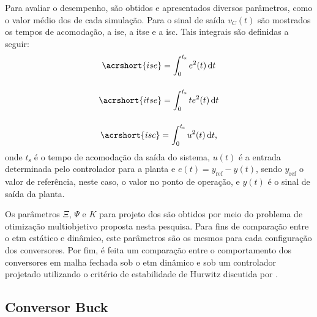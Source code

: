 Para avaliar o desempenho, são obtidos e apresentados diversos parâmetros, como o valor médio dos  de cada simulação. Para o sinal de saída  $v_C(t)$ são mostrados os tempos de acomodação, a \acrfull{ise}, a \acrfull{itse} e a \acrfull{isc}. Tais integrais são definidas a seguir: \begin{gather}
  \acrshort{ise} = \int_0^{t_\mathrm{s}} e^2(t) \, \mathrm{d}t \\[12pt]
  \acrshort{itse} = \int_0^{t_\mathrm{s}} t e^2(t) \, \mathrm{d}t \\[12pt]
  \acrshort{isc} = \int_0^{t_\mathrm{s}} u^2(t) \, \mathrm{d}t,
\end{gather} onde $t_{\mathrm{s}}$ é o tempo de acomodação da saída do sistema, $u(t)$ é a entrada determinada pelo controlador para a planta e $e(t) = y_{\mathrm{ref}} - y(t)$, sendo $y_{\mathrm{ref}}$ o valor de referência, neste caso, o valor no ponto de operação, e $y(t)$ é o sinal de saída da planta.

Os parâmetros $\Xi$, $\Psi$ e $K$ para projeto dos  são obtidos por meio do problema de otimização multiobjetivo proposta nesta pesquisa. Para fins de comparação entre o \acrshort{etm} estático e dinâmico, este parâmetros são os mesmos para cada configuração dos conversores. Por fim, é feita um comparação entre o comportamento dos conversores em malha fechada sob o \acrshort{etm} dinâmico e sob um controlador projetado utilizando o critério de estabilidade de Hurwitz discutida por \cite{Duan2013}.

\subsection{Conversor Buck}

